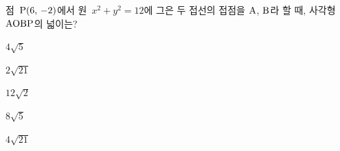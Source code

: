 점~$\mathrm{P}(6,\mkern3mu -2)$에서 원~$x^2+y^2=12$에 그은 두 접선의 접점을 $\mathrm{A}$, $\mathrm{B}$라 할 때, 사각형~$\mathrm{AOBP}$의 넓이는? 
\begin{choices32}{\rule[-3ex]{0pt}{8ex}$4\sqrt{5}$}{\rule[-3ex]{0pt}{8ex}$2\sqrt{21}$}{\rule[-3ex]{0pt}{8ex}$12\sqrt{2}$}{\rule[-3ex]{0pt}{8ex}$8\sqrt{5}$}{\rule[-3ex]{0pt}{8ex}$4\sqrt{21}$}\end{choices32}

